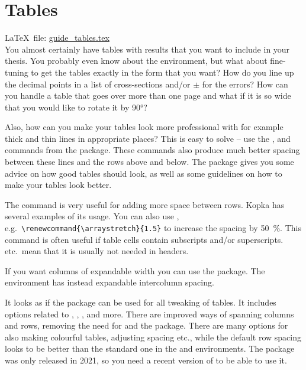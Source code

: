 
\chapter{Tables}%
\label{sec:table}

\LaTeX\ file: \href{run:./guide_tables.tex}{guide\_tables.tex}\\[1ex]
\noindent
You almost certainly have tables with results that you want to include
in your thesis. You probably even know about the 
environment, but what about fine-tuning to get the tables exactly in
the form that you want? How do you line up the decimal points in a
list of cross-sections and/or \(\pm\) for the errors? How can you
handle a table that goes over more than one page and what if it is so
wide that you would like to rotate it by \ang{90}?

Also, how can you make your tables look more professional with for
example thick and thin lines in appropriate places? This is easy to
solve -- use the ,  and 
commands from the  package. These commands also
produce much better spacing between these lines and the rows above and
below. The  package gives you some advice on how
good tables should look, as well as some guidelines on how to make your
tables look better.

The  command is very useful for adding more space between
rows. Kopka has several examples of its usage. You can also use
, e.g.\ \verb+\renewcommand{\arraystretch}{1.5}+ to
increase the spacing by \qty{50}{\percent}. This command is often useful if table
cells contain subscripts and/or superscripts. 
etc.\ mean that it is usually not needed in headers.

If you want columns of expandable width you can use the
 package. The environment  has instead
expandable intercolumn spacing.

It looks as if the package  can be used for all tweaking of tables.
It includes options related to , , ,
 and more.
There are improved ways of spanning columns and rows,
removing the need for  and the  package.
There are many options for also making colourful tables, adjusting spacing etc.,
while the default row spacing looks to be better than the standard one in the  and  environments.
The package was only released in 2021, so you need a recent version of \TeXLive to be able to use it.

